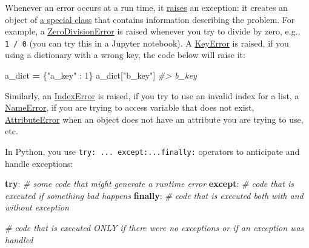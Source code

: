 \documentclass[
]{book}
\newenvironment{Shaded}{\begin{snugshade}}{\end{snugshade}}
\newcommand{\CommentTok}[1]{\textcolor[rgb]{0.56,0.35,0.01}{\textit{#1}}}
\newcommand{\ControlFlowTok}[1]{\textcolor[rgb]{0.13,0.29,0.53}{\textbf{#1}}}
\newcommand{\DecValTok}[1]{\textcolor[rgb]{0.00,0.00,0.81}{#1}}
\newcommand{\NormalTok}[1]{#1}
\newcommand{\OperatorTok}[1]{\textcolor[rgb]{0.81,0.36,0.00}{\textbf{#1}}}
\newcommand{\StringTok}[1]{\textcolor[rgb]{0.31,0.60,0.02}{#1}}
\begin{document}
Whenever an error occurs at a run time, it \href{https://docs.python.org/3/reference/simple_stmts.html\#the-raise-statement}{raises} an exception: it creates an object of \href{https://docs.python.org/3/library/exceptions.html\#concrete-exceptions}{a special class} that contains information describing the problem. For example, a \href{https://docs.python.org/3/library/exceptions.html\#ZeroDivisionError}{ZeroDivisionError} is raised whenever you try to divide by zero, e.g., \texttt{1\ /\ 0} (you can try this in a Jupyter notebook). A \href{https://docs.python.org/3/library/exceptions.html\#KeyError}{KeyError} is raised, if you using a dictionary with a wrong key, the code below will raise it:

\begin{Shaded}
\begin{Highlighting}[]
\NormalTok{a\_dict }\OperatorTok{=}\NormalTok{ \{}\StringTok{"a\_key"}\NormalTok{ : }\DecValTok{1}\NormalTok{\}}
\NormalTok{a\_dict[}\StringTok{"b\_key"}\NormalTok{]}
\CommentTok{\#\textgreater{} \textquotesingle{}b\_key\textquotesingle{}}
\end{Highlighting}
\end{Shaded}

Similarly, an \href{https://docs.python.org/3/library/exceptions.html\#IndexError}{IndexError} is raised, if you try to use an invalid index for a list, a \href{https://docs.python.org/3/library/exceptions.html\#NameError}{NameError}, if you are trying to access variable that does not exist, \href{https://docs.python.org/3/library/exceptions.html\#AttributeError}{AttributeError} when an object does not have an attribute you are trying to use, etc.

In Python, you use \texttt{try:\ ...\ except:...finally:} operators to anticipate and handle exceptions:

\begin{Shaded}
\begin{Highlighting}[]
\ControlFlowTok{try}\NormalTok{:}
    \CommentTok{\# some code that might generate a runtime error}
\ControlFlowTok{except}\NormalTok{:  }
    \CommentTok{\# code that is executed if something bad happens}
\ControlFlowTok{finally}\NormalTok{:}
    \CommentTok{\# code that is executed both with and without exception}
    
\CommentTok{\# code that is executed ONLY if there were no exceptions or if an exception was handled}
\end{Highlighting}
\end{Shaded}
\end{document}
